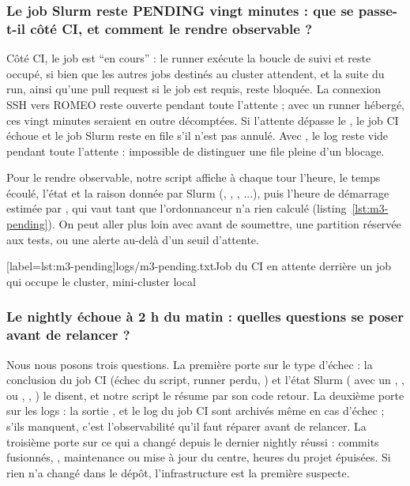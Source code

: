 \documentclass[11pt,a4paper]{article}
\newcommand{\fic}[1]{\code{#1}}
\begin{document}
\subsubsection{Le job Slurm reste PENDING vingt minutes : que se passe-t-il côté CI, et comment le rendre observable ?}

Côté CI, le job est \enquote{en cours} : le runner exécute la boucle de suivi et reste occupé,
si bien que les autres jobs destinés au cluster attendent, et la suite du run, ainsi qu'une pull
request si le job est requis, reste bloquée. La connexion SSH vers ROMEO reste ouverte pendant
toute l'attente ; avec un runner hébergé, ces vingt minutes seraient en outre décomptées. Si
l'attente dépasse le , le job CI échoue et le job Slurm reste en file s'il n'est
pas annulé. Avec , le log reste vide pendant toute l'attente : impossible de
distinguer une file pleine d'un blocage.

Pour le rendre observable, notre script affiche à chaque tour l'heure, le temps écoulé, l'état
et la raison donnée par Slurm (, , ,
...), puis l'heure de démarrage estimée par , qui vaut
 tant que l'ordonnanceur n'a rien calculé (listing~\ref{lst:m3-pending}). On peut aller
plus loin avec  avant de soumettre, une partition réservée aux tests, ou
une alerte au-delà d'un seuil d'attente.

[label=lst:m3-pending]{logs/m3-pending.txt}{Job du CI en
attente derrière un job qui occupe le cluster, mini-cluster local}

\subsubsection{Le nightly échoue à 2 h du matin : quelles questions se poser avant de relancer ?}

Nous nous posons trois questions. La première porte sur le type d'échec : la conclusion du job CI
(échec du script, runner perdu, ) et l'état Slurm ( avec un
, , ou , , ) le disent,
et notre script le résume par son code retour. La deuxième porte sur les logs : la sortie
\fic{ci-JOBID.out}, \fic{sacct-JOBID.txt} et le log du job CI sont archivés même en cas d'échec ;
s'ils manquent, c'est l'observabilité qu'il faut réparer avant de relancer. La troisième porte
sur ce qui a changé depuis le dernier nightly réussi : commits fusionnés, \fic{spack.lock},
maintenance ou mise à jour du centre, heures du projet épuisées. Si rien n'a changé dans le
dépôt, l'infrastructure est la première suspecte.
\end{document}
